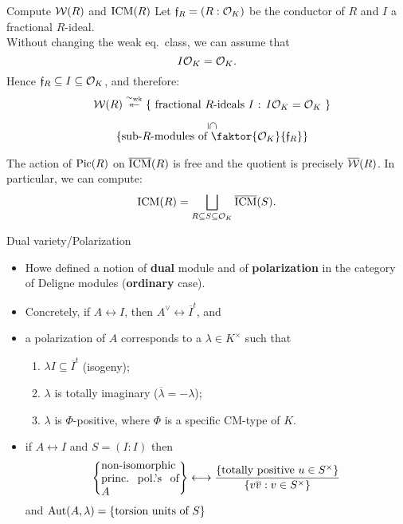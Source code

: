 \documentclass[handout]{beamer}
\begin{document}
\begin{frame}{ Compute ${\mathcal W}(R)$ and $\operatorname{ICM}(R)$ }
Let ${\mathfrak f}_R=(R:{\mathcal O}_K)$ be the conductor of $R$ and $I$ a fractional $R$-ideal.\\
Without changing the weak eq.~class, we can assume that
\[I{\mathcal O}_K={\mathcal O}_K.\]
Hence ${\mathfrak f}_R\subseteq I \subseteq {\mathcal O}_K$, and therefore:
\[\begin{array}{cc}
&\cW(R) \overset{\sim_{\text{wk}}}{\twoheadleftarrow} \set{\text{ fractional $R$-ideals $I$ : $I\cO_K = \cO_K$ }} \\
& \rotatebox{-90}{$\subseteq$} \\
& \set{\text{sub-$R$-modules of $\faktor{\cO_K}{\frf_R}$}} 
\end{array}\]
\pause \begin{theorem}
The action of $\operatorname{Pic}(R)$ on $\overline{\operatorname{ICM}}(R)$ is free and the quotient is precisely $\overline{{\mathcal W}}(R)$.
In particular, we can compute:
\[\operatorname{ICM}(R) = \bigsqcup_{R\subseteq S \subseteq {\mathcal O}_K} \overline {\operatorname{ICM}}(S).\]
\end{theorem}
\end{frame}

\begin{frame}{ Dual variety/Polarization }
\begin{itemize}
 \item Howe defined a notion of \textbf{dual} module and of \textbf{polarization} in the category of Deligne modules (\textbf{ordinary} case).
\pause \item Concretely, if $A\leftrightarrow I$, then $A^\vee \leftrightarrow \overline{I}^t$, and
\pause \item a polarization of $A$ corresponds to a $\lambda\in K^\times$ such that
      \begin{enumerate}[-]
       \item $\lambda I \subseteq \overline{I}^t$ (isogeny);
       \item $\lambda$ is totally imaginary ($\overline \lambda = -\lambda$);
       \item $\lambda$ is $\Phi$-positive, where $\Phi$ is a specific CM-type of $K$.
      \end{enumerate}     
\pause  \item if $A \leftrightarrow I$ and $S=(I:I)$ then
  \[\set{\parbox[p]{7em}{non-isomorphic princ.~pol.'s of $A$}} \longleftrightarrow \dfrac{\set{\text{totally positive }u\in S^\times }}{\set{v\overline{v}: v\in S^\times}}\]
  and $\operatorname{Aut}(A,\lambda) = \left\lbrace\text{torsion units of $S$}\right\rbrace$
\end{itemize}
\end{frame}
\end{document}
